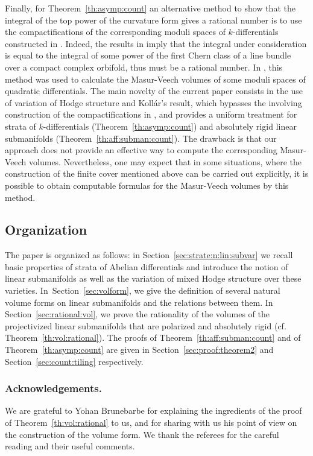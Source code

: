 \documentclass[11pt]{article}
\newcommand{\cf}{cf.\xspace}
\numberwithin{equation}{section}
\theoremstyle{plain}
\theoremstyle{definition}
\begin{document}
Finally, for Theorem~\ref{th:asymp:count} an alternative method to show that the integral of the top power of the curvature form gives a rational number is to use the compactifications of the corresponding moduli spaces of $k$-differentials constructed in \cite{BCGGM:multiscale, CMZ19}. Indeed, the results in \cite{CMZ19} imply that the integral under consideration is equal to the integral of some power of the first Chern class of a line bundle over a compact complex orbifold, thus must be a rational number. In \cite{CMS19}, this method was used to calculate the Masur-Veech volumes of some moduli spaces of quadratic differentials.
The main novelty of the current paper consists in the use of variation of Hodge structure and Kollár's result, which bypasses the involving construction of the compactifications in \cite{BCGGM:multiscale, CMZ19}, and provides a uniform treatment for strata of $k$-differentials (Theorem~\ref{th:asymp:count}) and absolutely rigid linear submanifolds (Theorem~\ref{th:aff:subman:count}).
The drawback is that our approach does not provide an effective way to compute the corresponding Masur-Veech volumes.
Nevertheless, one may expect that in some situations, where the construction of the finite cover mentioned above can be carried out explicitly, it is possible to obtain computable formulas for the Masur-Veech volumes by this method.

\subsection{Organization}\label{subsec:organization}
The paper is organized as follows: in Section~\ref{sec:strate:n:lin:subvar} we recall basic properties of strata of Abelian differentials and introduce the notion of linear submanifolds as well as the variation of mixed Hodge structure over these varieties. In~Section~\ref{sec:volform}, we give the definition of several natural volume forms on linear submanifolds and the relations between them. In Section~\ref{sec:rational:vol}, we prove the rationality of the volumes of the projectivized linear submanifolds that are polarized and absolutely rigid (\cf Theorem~\ref{th:vol:rational}). The proofs of Theorem~\ref{th:aff:subman:count} and of Theorem~\ref{th:asymp:count} are given in Section~\ref{sec:proof:theorem2} and Section~\ref{sec:count:tiling} respectively.

\subsubsection*{Acknowledgements.} We are grateful to Yohan Brunebarbe for explaining the ingre\-dients of the proof of Theorem~\ref{th:vol:rational} to us, and for sharing with us his point of view on the construction of the volume form. We thank the referees for the careful reading and their useful comments.
\end{document}
